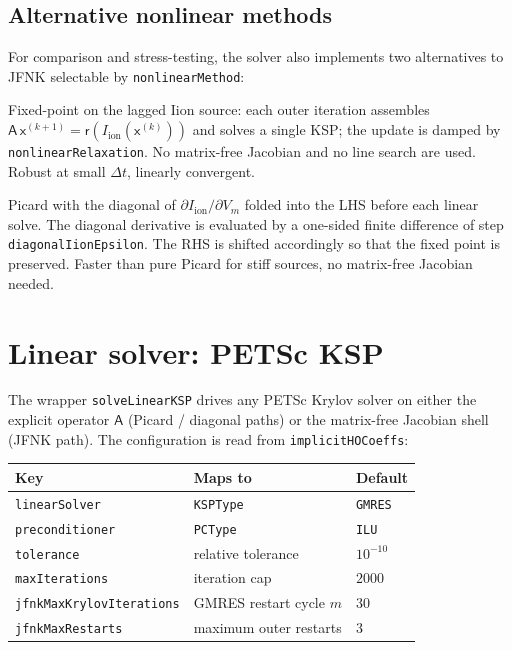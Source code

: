 \documentclass[11pt,a4paper]{article}
\newcommand{\Vm}{V_{m}}
\newcommand{\Iion}{I_{\text{ion}}}
\newcommand{\Aimp}{\mathsf{A}}
\newcommand{\code}[1]{\texttt{\small #1}}
\begin{document}
\subsection{Alternative nonlinear methods}

For comparison and stress-testing, the solver also implements two
alternatives to JFNK selectable by \code{nonlinearMethod}:
\begin{description}[style=nextline]
  \item[\code{picard}] Fixed-point on the lagged Iion source: each
        outer iteration assembles
        $\Aimp\, \mathsf{x}^{(k+1)} = \mathsf{r}(\Iion(\mathsf{x}^{(k)}))$
        and solves a single KSP; the update is damped by
        \code{nonlinearRelaxation}. No matrix-free Jacobian and no
        line search are used. Robust at small $\Delta t$,
        linearly convergent.
  \item[\code{diagonalIion} (or \code{diagonal},
        \code{localDiagonal})] Picard with the diagonal of
        $\partial \Iion / \partial \Vm$ folded into the LHS
        before each linear solve. The diagonal derivative is
        evaluated by a one-sided finite difference of step
        \code{diagonalIionEpsilon}. The RHS is shifted
        accordingly so that the fixed point is preserved. Faster
        than pure Picard for stiff sources, no matrix-free
        Jacobian needed.
\end{description}

\section{Linear solver: PETSc KSP}

The wrapper \code{solveLinearKSP} drives any PETSc Krylov solver on
either the explicit operator $\Aimp$ (Picard / diagonal paths) or the
matrix-free Jacobian shell (JFNK path). The configuration is read from
\code{implicitHOCoeffs}:
\begin{center}
\begin{tabular}{@{}lll@{}}
\toprule
Key & Maps to & Default \\
\midrule
\code{linearSolver} & \code{KSPType} & \code{GMRES} \\
\code{preconditioner} & \code{PCType} & \code{ILU} \\
\code{tolerance} & relative tolerance & $10^{-10}$ \\
\code{maxIterations} & iteration cap & $2000$ \\
\code{jfnkMaxKrylovIterations} & GMRES restart cycle $m$ & $30$ \\
\code{jfnkMaxRestarts} & maximum outer restarts & $3$ \\
\bottomrule
\end{tabular}
\end{center}
\end{document}
